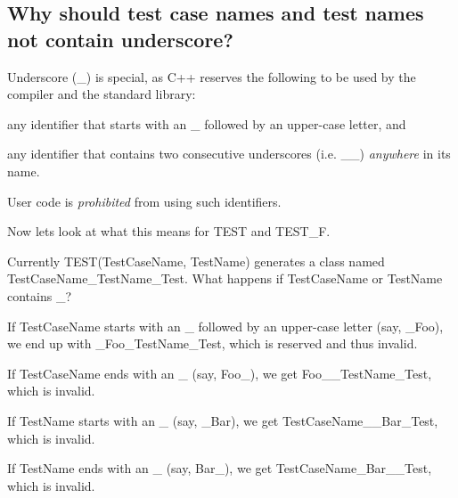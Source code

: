 \subsection*{Why should test case names and test names not contain underscore?}

Underscore ({\ttfamily \+\_\+}) is special, as C++ reserves the following to be used by the compiler and the standard library\+:


\begin{DoxyEnumerate}
\item any identifier that starts with an {\ttfamily \+\_\+} followed by an upper-\/case letter, and
\end{DoxyEnumerate}
\begin{DoxyEnumerate}
\item any identifier that contains two consecutive underscores (i.\+e. {\ttfamily \+\_\+\+\_\+}) {\itshape anywhere} in its name.
\end{DoxyEnumerate}

User code is {\itshape prohibited} from using such identifiers.

Now let\textquotesingle{}s look at what this means for {\ttfamily T\+E\+ST} and {\ttfamily T\+E\+S\+T\+\_\+F}.

Currently {\ttfamily T\+E\+S\+T(\+Test\+Case\+Name, Test\+Name)} generates a class named {\ttfamily Test\+Case\+Name\+\_\+\+Test\+Name\+\_\+\+Test}. What happens if {\ttfamily Test\+Case\+Name} or {\ttfamily Test\+Name} contains {\ttfamily \+\_\+}?


\begin{DoxyEnumerate}
\item If {\ttfamily Test\+Case\+Name} starts with an {\ttfamily \+\_\+} followed by an upper-\/case letter (say, {\ttfamily \+\_\+\+Foo}), we end up with {\ttfamily \+\_\+\+Foo\+\_\+\+Test\+Name\+\_\+\+Test}, which is reserved and thus invalid.
\end{DoxyEnumerate}
\begin{DoxyEnumerate}
\item If {\ttfamily Test\+Case\+Name} ends with an {\ttfamily \+\_\+} (say, {\ttfamily Foo\+\_\+}), we get {\ttfamily Foo\+\_\+\+\_\+\+Test\+Name\+\_\+\+Test}, which is invalid.
\end{DoxyEnumerate}
\begin{DoxyEnumerate}
\item If {\ttfamily Test\+Name} starts with an {\ttfamily \+\_\+} (say, {\ttfamily \+\_\+\+Bar}), we get {\ttfamily Test\+Case\+Name\+\_\+\+\_\+\+Bar\+\_\+\+Test}, which is invalid.
\end{DoxyEnumerate}
\begin{DoxyEnumerate}
\item If {\ttfamily Test\+Name} ends with an {\ttfamily \+\_\+} (say, {\ttfamily Bar\+\_\+}), we get {\ttfamily Test\+Case\+Name\+\_\+\+Bar\+\_\+\+\_\+\+Test}, which is invalid.
\end{DoxyEnumerate}

